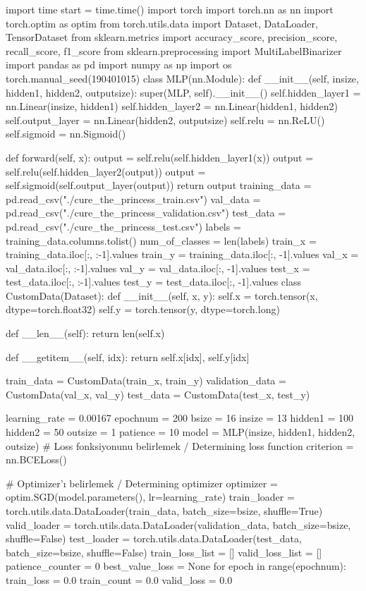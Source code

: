 \documentclass[11pt]{article}
\begin{document}
\begin{python}
import time
start = time.time()
import torch
import torch.nn as nn
import torch.optim as optim
from torch.utils.data import Dataset, DataLoader, TensorDataset
from sklearn.metrics import accuracy_score, precision_score, recall_score, f1_score
from sklearn.preprocessing import MultiLabelBinarizer
import pandas as pd
import numpy as np
import os
torch.manual_seed(190401015)
class MLP(nn.Module):
    def __init__(self, insize, hidden1, hidden2, outputsize):
        super(MLP, self).__init__()
        self.hidden_layer1 = nn.Linear(insize, hidden1)
        self.hidden_layer2 = nn.Linear(hidden1, hidden2)
        self.output_layer = nn.Linear(hidden2, outputsize)
        self.relu = nn.ReLU()
        self.sigmoid = nn.Sigmoid()

    def forward(self, x):
        output = self.relu(self.hidden_layer1(x))
        output = self.relu(self.hidden_layer2(output))
        output = self.sigmoid(self.output_layer(output))
        return output
training_data = pd.read_csv("./cure_the_princess_train.csv")
val_data = pd.read_csv("./cure_the_princess_validation.csv")
test_data = pd.read_csv("./cure_the_princess_test.csv")
labels = training_data.columns.tolist()
num_of_classes = len(labels)
train_x = training_data.iloc[:, :-1].values
train_y = training_data.iloc[:, -1].values
val_x = val_data.iloc[:, :-1].values
val_y = val_data.iloc[:, -1].values
test_x = test_data.iloc[:, :-1].values
test_y = test_data.iloc[:, -1].values
class CustomData(Dataset):
    def __init__(self, x, y):
        self.x = torch.tensor(x, dtype=torch.float32)
        self.y = torch.tensor(y, dtype=torch.long)

    def __len__(self):
        return len(self.x)

    def __getitem__(self, idx):
        return self.x[idx], self.y[idx]

train_data = CustomData(train_x, train_y)
validation_data = CustomData(val_x, val_y)
test_data = CustomData(test_x, test_y)

learning_rate = 0.00167
epochnum = 200
bsize = 16
insize = 13
hidden1 = 100
hidden2 = 50
outsize = 1
patience = 10
model = MLP(insize, hidden1, hidden2, outsize)
# Loss fonksiyonunu belirlemek / Determining loss function
criterion = nn.BCELoss()

# Optimizer'ı belirlemek / Determining optimizer
optimizer = optim.SGD(model.parameters(), lr=learning_rate)
train_loader = torch.utils.data.DataLoader(train_data, batch_size=bsize, shuffle=True)
valid_loader = torch.utils.data.DataLoader(validation_data, batch_size=bsize, shuffle=False)
test_loader = torch.utils.data.DataLoader(test_data, batch_size=bsize, shuffle=False)
train_loss_list = []
valid_loss_list = []
patience_counter = 0
best_value_loss = None
for epoch in range(epochnum):
    train_loss = 0.0
    train_count = 0.0
    valid_loss = 0.0


\end{python}
\end{document}
